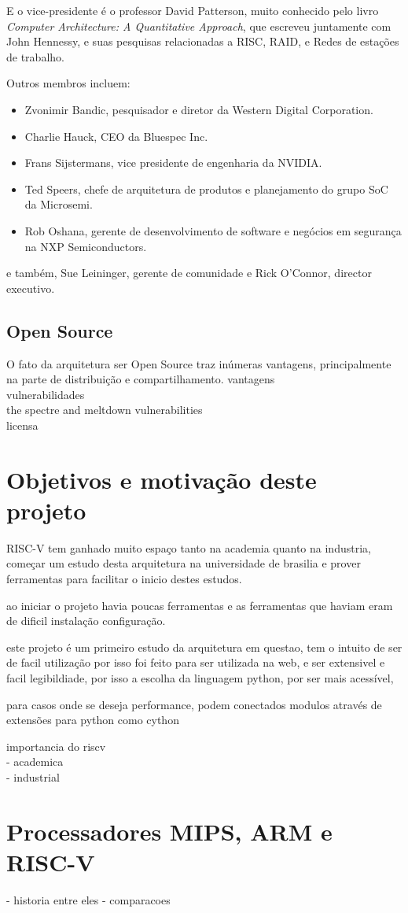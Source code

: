		E o vice-presidente é o professor David Patterson, muito conhecido pelo livro \textit{Computer Architecture: A Quantitative Approach}, que escreveu juntamente com John Hennessy, e suas pesquisas relacionadas a RISC, RAID, e Redes de estações de trabalho.\

		Outros membros incluem:\
		\begin{itemize}  
			\item Zvonimir Bandic, pesquisador e diretor da Western Digital Corporation. 
			\item Charlie Hauck, CEO da Bluespec Inc.
			\item Frans Sijstermans, vice presidente de engenharia da NVIDIA.
			\item Ted Speers, chefe de arquitetura de produtos e planejamento do grupo SoC da Microsemi.
			\item Rob Oshana, gerente de desenvolvimento de software e negócios em segurança na NXP Semiconductors. 
		\end{itemize}

		e também, Sue Leininger, gerente de comunidade e Rick O’Connor, director executivo.~\cite{riscv_fboardmembers}

	\subsection{Open Source}
		
		O fato da arquitetura ser Open Source traz inúmeras vantagens, principalmente na parte de distribuição e compartilhamento.
		vantagens\\
			vulnerabilidades\\
			the spectre and meltdown vulnerabilities\\
		licensa\\




\section{Objetivos e motivação deste projeto}

	RISC-V tem ganhado muito espaço tanto na academia quanto na industria, começar um estudo desta arquitetura na universidade de brasilia e prover ferramentas para facilitar o inicio destes estudos.

	ao iniciar o projeto havia poucas ferramentas e as ferramentas que haviam eram de dificil instalação configuração.

	este projeto é um primeiro estudo da arquitetura em questao, tem o intuito de ser de facil utilização por isso foi feito para ser utilizada na web, e ser extensivel e facil legibildiade, por isso a escolha da linguagem python, por ser mais acessível,

	para casos onde se deseja performance, podem conectados modulos através de extensões para python como cython~\cite{cython_home}



importancia do riscv\\
			- academica\\
			- industrial\\



\section{Processadores MIPS, ARM e RISC-V}%

		- historia entre eles
		- comparacoes
